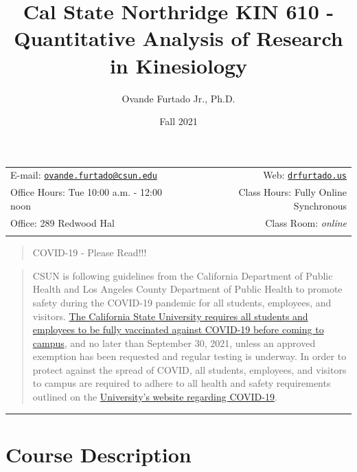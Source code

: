 \documentclass[11pt,]{article}
\title{Cal State Northridge \textbar{} KIN 610 - Quantitative Analysis
of Research in Kinesiology}
\author{Ovande Furtado Jr., Ph.D.}
\date{Fall 2021}
\begin{document}
  

		\maketitle
		
	
		\thispagestyle{firststyle}



	\noindent \begin{tabular*}{\textwidth}{ @{\extracolsep{\fill}} lr @{\extracolsep{\fill}}}


E-mail: \texttt{\href{mailto:ovande.furtado@csun.edu}{\nolinkurl{ovande.furtado@csun.edu}}} & Web: \href{http://drfurtado.us}{\tt drfurtado.us}\\
Office Hours: Tue 10:00 a.m. - 12:00 noon  &  Class Hours: Fully Online
Synchronous\\
Office: 289 Redwood Hal  & Class Room: \emph{online}\\
	&  \\
	\hline
	\end{tabular*}
	
\vspace{2mm}
	


\begin{quote}
COVID-19 - Please Read!!!
\end{quote}

\begin{quote}
CSUN is following guidelines from the California Department of Public
Health and Los Angeles County Department of Public Health to promote
safety during the COVID-19 pandemic for all students, employees, and
visitors.
\href{http://www.csun.edu/ua/email/NCpages/0813_student_vaccination.html}{The
California State University requires all students and employees to be
fully vaccinated against COVID-19 before coming to campus}, and no later
than September 30, 2021, unless an approved exemption has been requested
and regular testing is underway. In order to protect against the spread
of COVID, all students, employees, and visitors to campus are required
to adhere to all health and safety requirements outlined on the
\href{https://www.csun.edu/matadors-forward/health-and-safety}{University's
website regarding COVID-19}.
\end{quote}

\begin{center}\rule{0.5\linewidth}{0.5pt}\end{center}

\hypertarget{course-description}{%
\section{Course Description}\label{course-description}}
\end{document}
